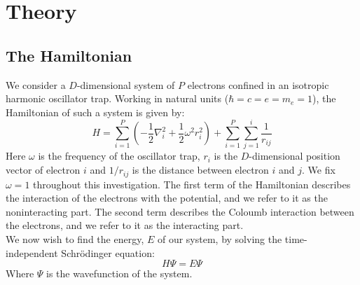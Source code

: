 \documentclass[a4paper, 10pt]{article}
\begin{document}
	\section{Theory}\label{sec:Theory}
	\subsection{The Hamiltonian}
	We consider a $D$-dimensional system of $P$ electrons confined in an isotropic harmonic oscillator trap. Working in natural units ($\hbar=c=e=m_e=1$), the Hamiltonian of such a system is given by:
	\begin{equation}\label{eq:Hamiltonian}
	H=\sum_{i=1}^P \left(-\frac{1}{2}\nabla_i^2 +\frac{1}{2}\omega^2 r_i^2\right)+\sum_{i=1}^P \sum_{j=1}^{i}\frac{1}{r_{ij}}
	\end{equation}
	Here $\omega$ is the frequency of the oscillator trap, $r_{i}$ is the $D$-dimensional position vector of electron $i$ and $1/r_{ij}$ is the distance between electron $i$ and $j$. We fix $\omega=1$ throughout this investigation. The first term of the Hamiltonian describes the interaction of the electrons with the potential, and we refer to it as the noninteracting part. The second term describes the Coloumb interaction between the electrons, and we refer to it as the interacting part.\\
	\linebreak
	We now wish to find the energy, $E$ of our system, by solving the time-independent Schrödinger equation:
	\begin{equation}\label{eq:time_depenedent_schrodinger}
	H\Psi = E\Psi
	\end{equation}
	Where $\Psi$ is the wavefunction of the system.
\end{document}
